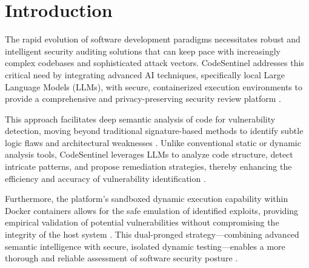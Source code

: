 \section{Introduction}
\label{sec:introduction}

The rapid evolution of software development paradigms necessitates robust and intelligent security auditing solutions that can keep pace with increasingly complex codebases and sophisticated attack vectors. CodeSentinel addresses this critical need by integrating advanced AI techniques, specifically local Large Language Models (LLMs), with secure, containerized execution environments to provide a comprehensive and privacy-preserving security review platform \cite{bouzid2025}. 

This approach facilitates deep semantic analysis of code for vulnerability detection, moving beyond traditional signature-based methods to identify subtle logic flaws and architectural weaknesses \cite{ferrag2025, yao2024}. Unlike conventional static or dynamic analysis tools, CodeSentinel leverages LLMs to analyze code structure, detect intricate patterns, and propose remediation strategies, thereby enhancing the efficiency and accuracy of vulnerability identification \cite{sheng2025}. 

Furthermore, the platform's sandboxed dynamic execution capability within Docker containers allows for the safe emulation of identified exploits, providing empirical validation of potential vulnerabilities without compromising the integrity of the host system \cite{moia2026}. This dual-pronged strategy---combining advanced semantic intelligence with secure, isolated dynamic testing---enables a more thorough and reliable assessment of software security posture \cite{omar2023}.
